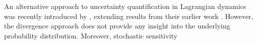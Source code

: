 An alternative approach to uncertainty quantification in Lagrangian dynamics was recently introduced by \citet{BranickiUda_2023_PathBasedDivergenceRates}, extending results from their earlier work \citep{BranickiUda_2021_LagrangianUncertaintyQuantification}.
However, the divergence approach does not provide any insight into the underlying probability distribution.
Moreover, stochastic sensitivity


